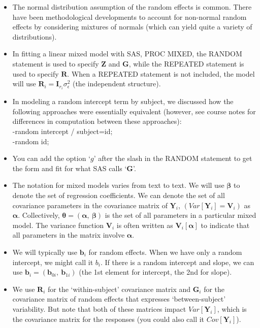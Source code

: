 \documentclass[
  9pt,
  ignorenonframetext,
]{beamer}
\begin{document}
\begin{frame}{}
\protect\hypertarget{section-4}{}
\begin{itemize}
\item
  The normal distribution assumption of the random effects is common.
  There have been methodological developments to account for non-normal
  random effects by considering mixtures of normals (which can yield
  quite a variety of distributions).
\item
  In fitting a linear mixed model with SAS, PROC MIXED, the RANDOM
  statement is used to specify \(\pmb Z\) and \(\pmb G\), while the
  REPEATED statement is used to specify \(\pmb R\). When a REPEATED
  statement is not included, the model will use
  \(\pmb R_i = \pmb I_{r_i}\sigma_\epsilon^2\) (the independent
  structure).
\item
  In modeling a random intercept term by subject, we discussed how the
  following approaches were essentially equivalent (however, see course
  notes for differences in computation between these approaches):\\
  -\alert {random} intercept / subject=id;\\
  -\alert {random} id;
\item
  You can add the option `\(g\)' after the slash in the RANDOM statement
  to get the form and fit for what SAS calls `\(\pmb G\)'.
\end{itemize}
\end{frame}

\begin{frame}{}
\protect\hypertarget{section-5}{}
\begin{itemize}
\item
  The notation for mixed models varies from text to text. We will use
  \(\pmb \beta\) to denote the set of regression coefficients. We can
  denote the set of all covariance parameters in the covariance matrix
  of \(\pmb Y_i\), \((Var[\pmb Y_i]= \pmb V_i)\) as \(\pmb \alpha\).
  Collectively, \(\pmb \theta=(\pmb \alpha,\ \pmb \beta)\) is the set of
  all parameters in a particular mixed model. The variance function
  \(\pmb V_i\) is often written as \(\pmb V_i[\pmb \alpha]\) to indicate
  that all parameters in the matrix involve \(\pmb \alpha\).
\item
  We will typically use \(\pmb b_i\) for random effects. When we have
  only a random intercept, we might call it \(b_i\). If there is a
  random intercept and slope, we can use
  \(\pmb b_i = (\pmb b_{0i},\ \pmb b_{1i})\) (the 1st element for
  intercept, the 2nd for slope).
\item
  We use \(\pmb R_i\) for the `within-subject' covariance matrix and
  \(\pmb G_i\) for the covariance matrix of random effects that
  expresses `between-subject' variability. But note that both of these
  matrices impact \(Var[\pmb Y_i]\), which is the covariance matrix for
  the responses (you could also call it \(Cov[\pmb Y_i]\)).
\end{itemize}
\end{frame}
\end{document}
